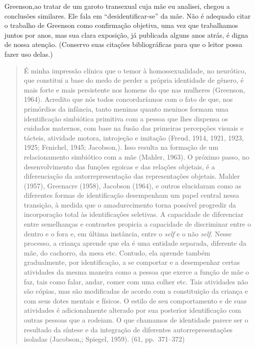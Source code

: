 Greenson,\idxgrens[|(] ao tratar de um garoto transexual cuja mãe eu analisei,
chegou a conclusões similares. Ele fala em
``desidentificar-se'' da mãe. Não é adequado
citar o trabalho de Greenson como confirmação objetiva, uma vez que
trabalhamos juntos por anos, mas sua clara exposição, já publicada
alguns anos atrás, é digna de nossa atenção. (Conservo suas citações
bibliográficas para que o leitor possa fazer uso delas.)

\begin{quote}
É minha impressão clínica que o temor à homossexualidade, no
neurótico, que constitui a base do medo de perder a própria identidade
de gênero,\idxiden{} é mais forte e mais persistente nos homens do que nas
mulheres (Greenson, 1964). Acredito que nós todos concordaríamos
com o fato de que, nos primórdios da infância, tanto meninas quanto
meninos formam uma identificação simbiótica primitiva\idxpaisiden{} com a pessoa que
lhes dispensa os cuidados maternos, com base na fusão das primeiras
percepções visuais e tácteis, atividade motora, introjeção e imitação
(Freud,\idxfreud{} 1914, 1921, 1923, 1925; Fenichel,\idxfenic{} 1945; Jacobson,). Isso
resulta na formação de um relacionamento simbiótico com a mãe\idxidentsimb{} (Mahler,\idxmahle{}
1963). O próximo passo, no desenvolvimento das funções\idxegoi{} egoicas\idxinfanego{} e das
relações objetais, é a diferenciação da autorrepresentação das
representações objetais. Mahler\idxmahle{} (1957), Greenacre\idxgrena{} (1958), Jacobson
(1964), e outros elucidaram como as diferentes formas de identificação
desempenham um papel central nessa transição, à medida que o
amadurecimento torna possível progredir da incorporação total às
identificações seletivas. A capacidade de diferenciar entre semelhanças
e contrastes propicia a capacidade de discriminar entre o dentro e o
fora e, em última instância, entre o \textit{self} e o não \textit{self}. Nesse
processo, a criança aprende que ela é uma entidade separada, diferente
da mãe, do cachorro, da mesa etc. Contudo, ela aprende também
gradualmente, por identificação, a se comportar e a desempenhar certas
atividades da mesma maneira como a pessoa que exerce a função de mãe o
faz, tais como falar, andar, comer com uma colher etc. Tais atividades
não são cópias, mas são modificadas de acordo com a constituição da
criança e com seus dotes mentais e físicos. O estilo de seu
comportamento e de suas atividades é adicionalmente alterado por sua
posterior identificação com outras pessoas que a rodeiam. O que
chamamos de identidade parece ser o resultado da síntese e da
integração de diferentes autorrepresentações isoladas (Jacobson,;
Spiegel, 1959). (61, pp.~371--372)
\end{quote}

